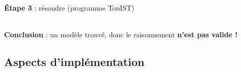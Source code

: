\documentclass[english,french,usenames,dvipsnames]{beamer}
\begin{document}
\begin{frame}{\subsecname}
\begin{center}\textbf{Étape 3} : résoudre (programme TouIST)\end{center}
\end{frame}

\begin{frame}{\subsecname}
\vspace{0cm} \\
\textbf{Conclusion} : un modèle trouvé, donc le raisonnement \textbf{n'est pas valide !}
\end{frame}


\subsection{Aspects d'implémentation}
\end{document}
